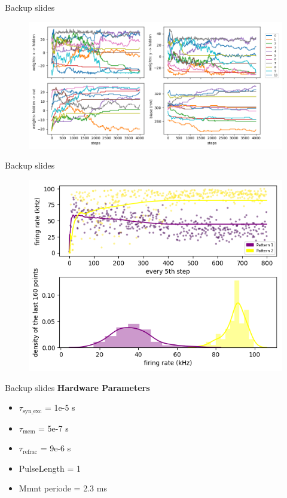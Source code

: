 \documentclass[12pt, aspectratio=169]{beamer}
\begin{document}
\appendix

\begin{frame}[fragile]{Backup slides}
\centering
        \begin{figure}
            \includegraphics[scale=0.5]{mfp/model_parameters.png}
            \label{fig:my_label}
        \end{figure}
\end{frame}

\begin{frame}[fragile]{Backup slides}
\centering
        \begin{figure}
            \includegraphics[scale=0.65]{mfp/rates_dist.png}
            \label{fig:my_label}
        \end{figure}
\end{frame}

\begin{frame}[fragile]{Backup slides}
\textbf{Hardware Parameters}
\begin{itemize}
    \item $\tau_{\text{syn\_exc}}$ = 1e-5 s
    \item $\tau_{\text{mem}}$ = 5e-7 s
    \item $\tau_{\text{refrac}}$ = 9e-6 s
    \item PulseLength = 1
    \item Mmnt periode = 2.3 ms
\end{itemize}
\end{frame}
  	
\end{document}

